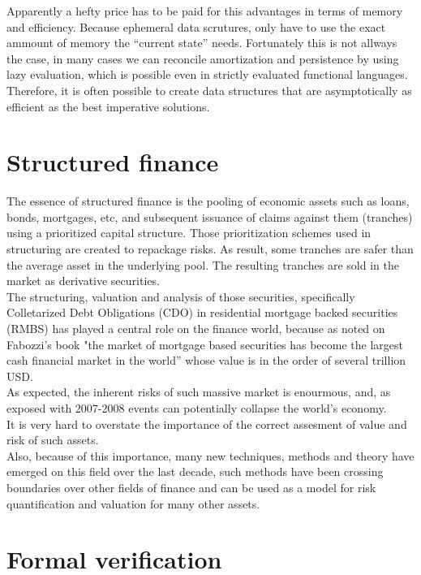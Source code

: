 \documentclass{tufte-book} %
\begin{document}
Apparently a hefty price has to be paid for this advantages in terms of memory and efficiency. Because ephemeral data scrutures, only have to use the exact ammount of memory the ``current state'' needs. Fortunately this is not allways the case, in many cases we can reconcile amortization and persistence by using lazy evaluation, which is possible even in strictly evaluated functional languages. Therefore, it is often possible to create data structures that are asymptotically as efficient as the best imperative solutions.

\section{Structured finance}

The essence of structured finance is the pooling of economic assets such as loans, bonds, mortgages, etc, and subsequent issuance of claims against them (tranches) using a prioritized capital structure. Those prioritization schemes used in structuring are created to repackage risks. As result, some tranches are safer than the average asset in the underlying pool. The resulting tranches are sold in the market as derivative securities.\\

The structuring, valuation and analysis of those securities, specifically Colletarized Debt Obligations (CDO) in residential mortgage backed securities (RMBS) has played a central role on the finance world, because as noted on Fabozzi's book \cite{Fabozzi2010} "the market of mortgage based securities has become the largest cash financial market in the world'' whose value is in the order of several trillion USD.\\

As expected, the inherent risks of such massive market is enourmous, and, as exposed with 2007-2008 events can potentially collapse the world's economy.\\
It is very hard to overstate the importance of the correct assesment of value and risk of such assets.\\

Also, because of this importance, many new techniques, methods and theory have emerged on this field over the last decade, such methods have been crossing boundaries over other fields of finance and can be used as a model for risk quantification and valuation for many other assets.\\

\newpage
\section{Formal verification}
\end{document}
